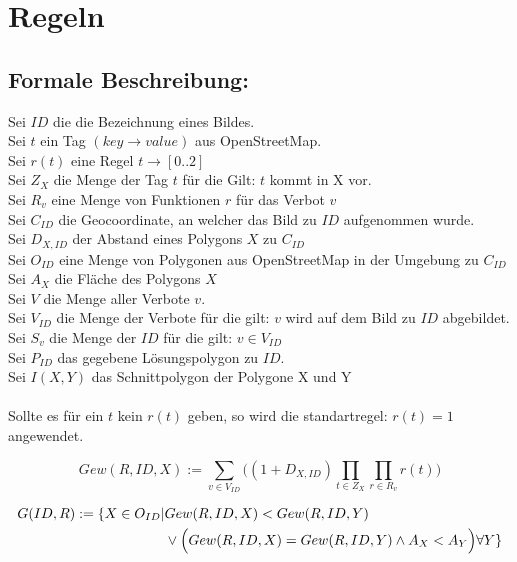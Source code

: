 \section{Regeln}

\subsection{Formale Beschreibung:}
Sei $ID$ die die Bezeichnung eines Bildes.\\
Sei $t$ ein Tag $(key \to value)$ aus OpenStreetMap.\\
Sei $r(t)$ eine Regel $t \to [0..2]$ \\
Sei $Z_{X}$ die Menge der Tag $t$ für die Gilt: $t$ kommt in X vor. \\
Sei $R_v$ eine Menge von Funktionen $r$ für das Verbot $v$\\
Sei $C_{ID}$ die Geocoordinate, an welcher das Bild zu $ID$ aufgenommen wurde. \\
Sei $D_{X,ID}$ der Abstand eines Polygons $X$ zu $C_{ID}$ \\
Sei $O_{ID}$ eine Menge von Polygonen aus OpenStreetMap in der Umgebung zu $C_{ID}$\\
Sei $A_{X}$ die Fläche des Polygons $X$\\
Sei $V$ die Menge aller Verbote $v$.\\
Sei $V_{ID}$ die Menge der Verbote für die gilt: $v$ wird auf dem Bild zu $ID$ abgebildet.\\
Sei $S_{v}$ die Menge der $ID$ für die gilt: $v \in V_{ID}$\\
Sei $P_{ID}$ das gegebene Lösungspolygon zu $ID$.\\
Sei $I(X,Y)$ das Schnittpolygon der Polygone X und Y\\
\\
Sollte es für ein $t$ kein $r(t)$ geben, so wird die standartregel:
$r(t) = 1$ angewendet.

\begin{equation}
Gew(R,ID,X) := \sum_{v \in V_{ID}} \Big((1 + D_{X,ID})\prod_{t \in Z_X} \prod_{r \in R_v} r(t)\Big)
\end{equation}

\begin{align}
G(ID,R) := \{X \in O_{ID} | & Gew(R,ID,X) < Gew(R,ID,Y)\\
& \lor \Big(Gew(R,ID,X)=Gew(R,ID,Y) \land A_X < A_Y\Big) \forall Y\} \notag
\end{align}

